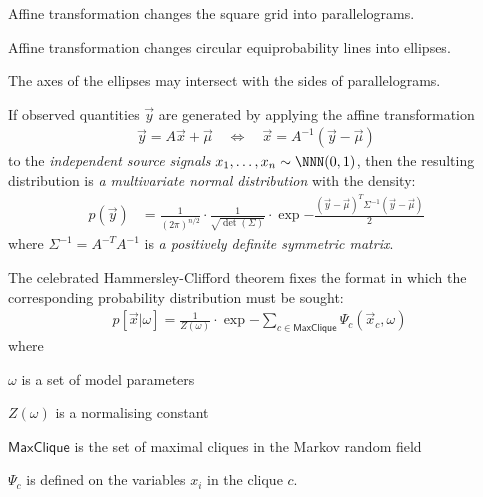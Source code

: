 \documentclass[landscape,footrule]{foils}
\begin{document}
\begin{triangles}
\item Affine transformation changes the square grid into parallelograms. 
\item Affine transformation changes circular equiprobability lines into ellipses. 
\item The axes of the ellipses may intersect with the sides of parallelograms.
\end{triangles}




If observed quantities $\vec{y}$ are generated by applying the affine transformation 
\begin{align*}
 \vec{y}=A\vec{x}+\vec{\mu}\quad\Leftrightarrow\quad \vec{x}=A^{-1}(\vec{y}-\vec{\mu})\enspace
\end{align*}
to the \emph{independent source signals} $x_1,\ldots, x_n\sim\NNN(0,1)$, then the resulting distribution is \emph{a multivariate normal distribution} with the density:
\begin{align*}
p(\vec{y})&=\frac{1}{(2\pi)^{n/2}}\cdot\frac{1}{\sqrt{\det(\Sigma)}}\cdot
\exp{-\frac{(\vec{y}-\vec{\mu})^T \Sigma^{-1}(\vec{y}-\vec{\mu})}{2}}\enspace
\end{align*} 
where $\Sigma^{-1}=A^{-T}A^{-1}$ is \emph{a positively definite symmetric matrix}.






The celebrated Hammersley-Clifford theorem fixes the format in which the corresponding probability distribution must be sought:
\begin{align*}
p[\vec{x}|\omega]=\frac{1}{Z(\omega)}\cdot\exp{-\sum_{c\in\textsf{MaxClique}}\Psi_c(\vec{x}_c,\omega)} 
\end{align*} 
where 
\begin{triangles}
\item $\omega$ is a set of model parameters
\item $Z(\omega)$ is a normalising constant
\item $\textsf{MaxClique}$ is the set of maximal cliques in the Markov random field
\item $\Psi_c$ is defined on the variables $x_i$ in the clique $c$. 
\end{triangles}
\end{document}
